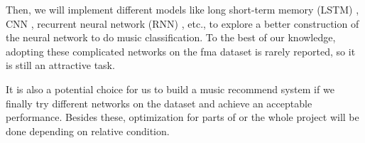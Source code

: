 \documentclass{article}
\begin{document}
Then, we will implement different models like long short-term memory (LSTM) \cite{sundermeyer2012lstm}, CNN \cite{lawrence1997face}, recurrent neural network (RNN) \cite{medsker2001recurrent}, etc., to explore a better construction of the neural network to do music classification. To the best of our knowledge, adopting these complicated networks on the fma dataset is rarely reported, so it is still an attractive task. 

It is also a potential choice for us to build a music recommend system if we finally try different networks on the dataset and achieve an acceptable performance. Besides these, optimization for parts of or the whole project will be done depending on relative condition.
 


\end{document}
